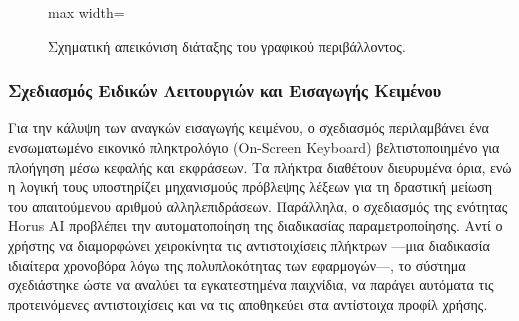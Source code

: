 \documentclass[twoside, a4paper, 11pt]{article}
\begin{document}
\begin{figure}[H]
\begin{adjustbox}{max width=\textwidth}
    \end{adjustbox}
    \caption{Σχηματική απεικόνιση διάταξης του γραφικού περιβάλλοντος.}
    \label{fig:wireframe_ui}
\end{figure}

\subsubsection{Σχεδιασμός Ειδικών Λειτουργιών και Εισαγωγής Κειμένου}
Για την κάλυψη των αναγκών εισαγωγής κειμένου, ο σχεδιασμός περιλαμβάνει ένα ενσωματωμένο εικονικό πληκτρολόγιο (On-Screen Keyboard) 
βελτιστοποιημένο για πλοήγηση μέσω κεφαλής και εκφράσεων. Τα πλήκτρα διαθέτουν διευρυμένα όρια, ενώ η λογική τους υποστηρίζει μηχανισμούς πρόβλεψης λέξεων για τη δραστική μείωση 
του απαιτούμενου αριθμού αλληλεπιδράσεων. 
Παράλληλα, ο σχεδιασμός της ενότητας Horus AI προβλέπει την αυτοματοποίηση της διαδικασίας παραμετροποίησης. 
Αντί ο χρήστης να διαμορφώνει χειροκίνητα τις αντιστοιχίσεις πλήκτρων —μια διαδικασία ιδιαίτερα χρονοβόρα λόγω της πολυπλοκότητας των εφαρμογών—, 
το σύστημα σχεδιάστηκε ώστε να αναλύει τα εγκατεστημένα παιχνίδια, να παράγει αυτόματα τις προτεινόμενες αντιστοιχίσεις και να τις αποθηκεύει στα αντίστοιχα προφίλ χρήσης.
\end{document}
